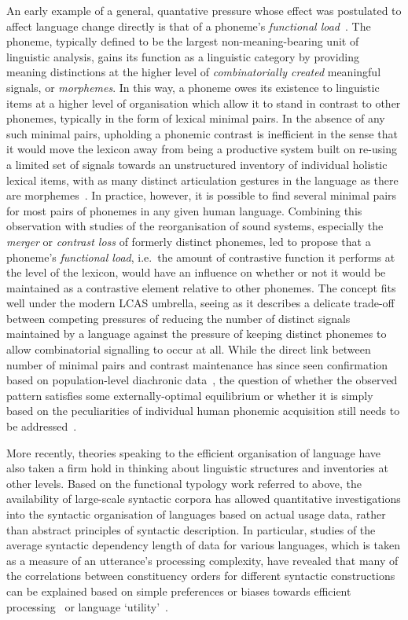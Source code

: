 An early example of a general, quantative pressure whose effect was postulated to affect language change directly is that of a phoneme's \emph{functional load}~\citep{Martinet1955}. The phoneme, typically defined to be the largest non-meaning-bearing unit of linguistic analysis, gains its function as a linguistic category by providing meaning distinctions at the higher level of \emph{combinatorially created} meaningful signals, or \emph{morphemes}. In this way, a phoneme owes its existence to linguistic items at a higher level of organisation which allow it to stand in contrast to other phonemes, typically in the form of lexical minimal pairs. In the absence of any such minimal pairs, upholding a phonemic contrast is inefficient in the sense that it would move the lexicon away from being a productive system built on re-using a limited set of signals towards an unstructured inventory of individual holistic lexical items, with as many distinct articulation gestures in the language as there are morphemes~\citep{Spike2016}.
In practice, however, it is possible to find several minimal pairs for most pairs of phonemes in any given human language. Combining this observation with studies of the reorganisation of sound systems, especially the \emph{merger} or \emph{contrast loss} of formerly distinct phonemes, led \citet{Martinet1955} to propose that a phoneme's \emph{functional load}, i.e.~the amount of contrastive function it performs at the level of the lexicon, would have an influence on whether or not it would be maintained as a contrastive element relative to other phonemes. The concept fits well under the modern LCAS umbrella, seeing as it describes a delicate trade-off between competing pressures of reducing the number of distinct signals maintained by a language against the pressure of keeping distinct phonemes to allow combinatorial signalling to occur at all. While the direct link between number of minimal pairs and contrast maintenance has since seen confirmation based on population-level diachronic data~\citep{Wedel2013short}, the question of whether the observed pattern satisfies some externally-optimal equilibrium or whether it is simply based on the peculiarities of individual human phonemic acquisition still needs to be addressed~\citep{Spike2016thesis}.

More recently, theories speaking to the efficient organisation of language have also taken a firm hold in thinking about linguistic structures and inventories at other levels.
Based on the functional typology work referred to above, the availability of large-scale syntactic corpora has allowed quantitative investigations into the syntactic organisation of languages based on actual usage data, rather than abstract principles of syntactic description. In particular, studies of the average syntactic dependency length of data for various languages, which is taken as a measure of an utterance's processing complexity, have revealed that many of the correlations between constituency orders for different syntactic constructions can be explained based on simple preferences or biases towards efficient processing~\citep{Futrell2015} or language `utility'~\citep{Jaeger2010}.

